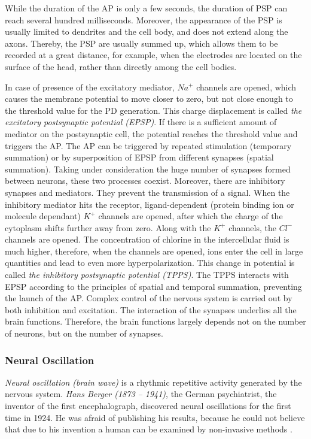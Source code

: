 \documentclass[14pt,a4paper]{scrartcl}
\begin{document}
While the duration of the AP is only a few seconds, the duration of PSP can reach several hundred milliseconds. Moreover, the appearance of the PSP is usually limited to dendrites and the cell body, and does not extend along the axons. Thereby, the PSP are usually summed up, which allows them to be recorded at a great distance, for example, when the electrodes are located on the surface of the head, rather than directly among the cell bodies. 

In case of presence of the excitatory mediator, $Na^{+}$ channels are opened, which causes the membrane potential to move closer to zero, but not close enough to the threshold value for the PD generation. This charge displacement is called \textit{the excitatory postsynaptic potential (EPSP)}. If there is a sufficient amount of mediator on the postsynaptic cell, the potential reaches the threshold value and triggers the AP. The AP can be triggered by repeated stimulation (temporary summation) or by superposition of EPSP from different synapses (spatial summation). Taking under consideration the huge number of synapses formed between neurons, these two processes coexist. Moreover, there are inhibitory synapses and mediators. They prevent the transmission of a signal. When the inhibitory mediator hits the receptor, ligand-dependent (protein binding ion or molecule dependant) $K^{+}$ channels are opened, after which the charge of the cytoplasm shifts further away from zero. Along with the $K^{+}$ channels, the $Cl^{-}$ channels are opened. The concentration of chlorine in the intercellular fluid is much higher, therefore, when the channels are opened, ions enter the cell in large quantities and lead to even more hyperpolarization. This change in potential is called \textit{the inhibitory postsynaptic potential (TPPS)}. The TPPS interacts with EPSP according to the principles of spatial and temporal summation, preventing the launch of the AP. Complex control of the nervous system is carried out by both inhibition and excitation. The interaction of the synapses underlies all the brain functions. Therefore, the brain functions largely depends not on the number of neurons, but on the number of synapses. 

\subsubsection{Neural Oscillation}
\label{sec:Hypothesis:Bioelectricity:Neural Oscillation}

\textit{Neural oscillation (brain wave)} is a rhythmic repetitive activity generated by the nervous system. \textit{Hans Berger (1873 – 1941)}, the German psychiatrist, the inventor of the first encephalograph, discovered neural oscillations for the first time in 1924. He was afraid of publishing his results, because he could not believe that due to his invention a human can be examined by non-invasive methods \cite{Shishkin12}. 
\end{document}
